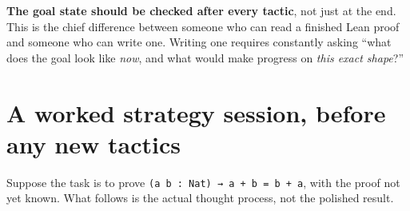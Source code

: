 \textbf{The goal state should be checked after every tactic}, not just at the end. This is the chief difference between someone who can read a finished Lean proof and someone who can write one. Writing one requires constantly asking ``what does the goal look like \emph{now}, and what would make progress on \emph{this exact shape}?''

\section{A worked strategy session, before any new tactics}\label{sec:04-tactics:01-goal-state:2}

Suppose the task is to prove \texttt{(a b : Nat) → a + b = b + a}, with the proof not yet known. What follows is the actual thought process, not the polished result.


